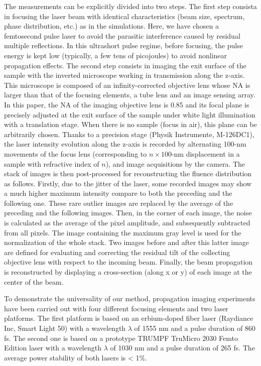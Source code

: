 \documentclass[9pt,twocolumn,twoside]{osajnl}
\begin{document}
The measurements can be explicitly divided into two steps. The first step consista in focusing the laser beam with identical characteristics (beam size, spectrum, phase distribution, etc.) as in the simulations. Here, we have chosen a femtosecond pulse laser to avoid the parasitic interference caused by residual multiple reflections. In this ultrashort pulse regime, before focusing, the pulse energy is kept low (typically, a few tens of picojoules) to avoid nonlinear propagation effects. The second step consists in imaging the exit surface of the sample with the inverted microscope working in transmission along the z-axis. This microscope is composed of an infinity-corrected objective lens whose NA is larger than that of the focusing elements, a tube lens and an image sensing array. In this paper, the NA of the imaging objective lens is 0.85 and its focal plane is precisely adjusted at the exit surface of the sample under white light illumination with a translation stage. When there is no sample (focus in air), this plane can be arbitrarily chosen. Thanks to a precision stage (Physik Instrumente, M-126DC1), the laser intensity evolution along the z-axis is recorded by alternating 100-nm movements of the focus lens (corresponding to $n\times100$-nm displacement in a sample with refractive index of $n$), and image acquisitions by the camera. The stack of images is then post-processed for reconstructing the fluence distribution as follows. Firstly, due to the jitter of the laser, some recorded images may show a much higher maximum intensity compare to both the preceding and the following one. These rare outlier images are replaced by the average of the preceding and the following images. Then, in the corner of each image, the noise is calculated as the average of the pixel amplitude, and subsequently subtracted from all pixels. The image containing the maximum gray level is used for the normalization of the whole stack. Two images before and after this latter image are defined for evaluating and correcting the residual tilt of the collecting objective lens with respect to the incoming beam. Finally, the beam propagation is reconstructed by displaying a cross-section (along x or y) of each image at the center of the beam. 

To demonstrate the universality of our method, propagation imaging experiments have been carried out with four different focusing elements and two laser platforms. The first platform is based on an erbium-doped fiber laser (Raydiance Inc, Smart Light 50) with a wavelength $\lambda$ of 1555 nm and a pulse duration of 860 fs. The second one is based on a prototype TRUMPF TruMicro 2030 Femto Edition laser with a wavelength $\lambda$ of 1030 nm and a pulse duration of 265 fs. The average power stability of both lasers is < 1\%. 
\end{document}
